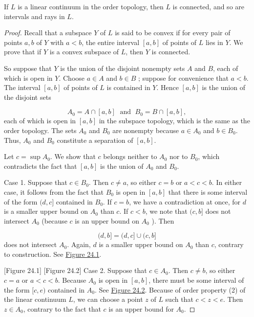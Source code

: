\begin{theorem}
\label{thm:\thetheorem}
 If \(L\) is a linear continuum in the order topology, then \(L\) is connected, and so are intervals and rays in \(L\).

\end{theorem}
\begin{proof}
Recall that a subspace \(Y\) of \(L\) is said to be convex if for every pair of points \(a,b\) of \(Y\) with \(a < b\), the entire interval \([ {a,b}]\) of points of \(L\) lies in \(Y\). We prove that if \(Y\) is a convex subspace of \(L\), then \(Y\) is connected.

So suppose that \(Y\) is the union of the disjoint nonempty sets \(A\) and \(B\), each of which is open in \(Y\). Choose \(a \in A\) and \(b \in B\) ; suppose for convenience that \(a < b\). The interval \([ {a,b}]\) of points of \(L\) is contained in \(Y\). Hence \([ {a,b}]\) is the union of the disjoint sets

\[
A_{0} = A \cap [ {a,b}] \;\text{ and }\;B_{0} = B \cap [ {a,b}] ,
\]
each of which is open in \([ {a,b}]\) in the subspace topology, which is the same as the order topology. The sets \(A_{0}\) and \(B_{0}\) are nonempty because \(a \in {A}_{0}\) and \(b \in {B}_{0}\). Thus, \(A_{0}\) and \(B_{0}\) constitute a separation of \([ {a,b}]\).

Let \(c = \sup {A}_{0}\). We show that \(c\) belongs neither to \(A_{0}\) nor to \(B_{0}\), which contradicts the fact that \([ {a,b}]\) is the union of \(A_{0}\) and \(B_{0}\).

Case 1. Suppose that \(c \in {B}_{0}\). Then \(c \neq a\), so either \(c = b\) or \(a < c < b\). In either case, it follows from the fact that \(B_{0}\) is open in \([ {a,b}]\) that there is some interval of the form \((d,c\rbrack\) contained in \(B_{0}\). If \(c = b\), we have a contradiction at once, for \(d\) is a smaller upper bound on \(A_{0}\) than \(c\). If \(c < b\), we note that \((c,b\rbrack\) does not intersect \(A_{0}\) (because \(c\) is an upper bound on \(A_{0}\) ). Then

\[
(d,b\rbrack = (d,c\rbrack \cup (c,b\rbrack
\]
does not intersect \(A_{0}\). Again, \(d\) is a smaller upper bound on \(A_{0}\) than \(c\), contrary to construction. See \hyperref[fig:24.1]{Figure 24.1}.

[Figure 24.1]
[Figure 24.2]
Case 2. Suppose that \(c \in {A}_{0}\). Then \(c \neq b\), so either \(c = a\) or \(a < c < b\). Because \(A_{0}\) is open in \([ {a,b}]\), there must be some interval of the form \(\lbrack c,e)\) contained in \(A_{0}\). See \hyperref[fig:24.2]{Figure 24.2}. Because of order property (2) of the linear continuum \(L\), we can choose a point \(z\) of \(L\) such that \(c < z < e\). Then \(z \in {A}_{0}\), contrary to the fact that \(c\) is an upper bound for \(A_{0}\).
\end{proof}

